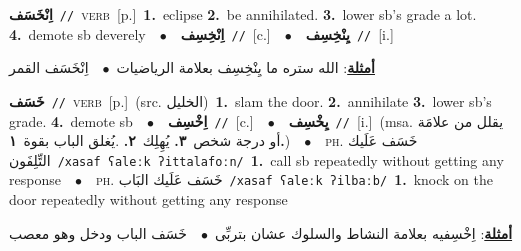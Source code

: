 \documentclass[10pt,a4paper,twoside]{article} %
\begin{document}
\begin{multicols}{2}
{\setlength\topsep{0pt}\textbf{\foreignlanguage{arabic}{اِنْخَسَف}}\ {\color{gray}\texttt{//}\color{black}}\ \textsc{verb}\ [p.]\ \textbf{1.}~eclipse  \textbf{2.}~be annihilated.  \textbf{3.}~lower sb's grade a lot.  \textbf{4.}~demote sb deverely\ \ $\bullet$\ \ \setlength\topsep{0pt}\textbf{\foreignlanguage{arabic}{اِنْخِسِف}}\ {\color{gray}\texttt{//}\color{black}}\ [c.]\ \ $\bullet$\ \ \setlength\topsep{0pt}\textbf{\foreignlanguage{arabic}{يِنْخِسِف}}\ {\color{gray}\texttt{//}\color{black}}\ [i.]\  \begin{flushright}\color{gray}\foreignlanguage{arabic}{\textbf{\underline{\foreignlanguage{arabic}{أمثلة}}}: الله ستره ما يِنْخِسِف بعلامة الرياضيات\ $\bullet$\ \  اِنْخَسَف القمر}\end{flushright}\color{black}} \vspace{2mm}

{\setlength\topsep{0pt}\textbf{\foreignlanguage{arabic}{خَسَف}}\ {\color{gray}\texttt{//}\color{black}}\ \textsc{verb}\ [p.]\ (src. \color{gray}\foreignlanguage{arabic}{الخليل}\color{black})\ \textbf{1.}~slam the door.  \textbf{2.}~annihilate  \textbf{3.}~lower sb's grade.  \textbf{4.}~demote sb\ \ $\bullet$\ \ \setlength\topsep{0pt}\textbf{\foreignlanguage{arabic}{اِخْسِف}}\ {\color{gray}\texttt{//}\color{black}}\ [c.]\ \ $\bullet$\ \ \setlength\topsep{0pt}\textbf{\foreignlanguage{arabic}{يِخْسِف}}\ {\color{gray}\texttt{//}\color{black}}\ [i.]\ \color{gray}(msa. \foreignlanguage{arabic}{يقلل من علامَة أو درجة شخص}~\foreignlanguage{arabic}{\textbf{٣.}}  \foreignlanguage{arabic}{يُهِلِك}~\foreignlanguage{arabic}{\textbf{٢.}}  .\foreignlanguage{arabic}{يُغلق الباب بقوة}~\foreignlanguage{arabic}{\textbf{١.}})\color{black}\ \ $\bullet$\ \ \textsc{ph.} \color{gray} \foreignlanguage{arabic}{خَسَف عَلَيك التِّلِفَون}\color{black}\ {\color{gray}\texttt{/{\sffamily xasaf ʕaleːk ʔittalafoːn}/}\color{black}}\ \textbf{1.}~call sb repeatedly without getting any response\ \ $\bullet$\ \ \textsc{ph.} \color{gray} \foreignlanguage{arabic}{خَسَف عَلَيك البَاب}\color{black}\ {\color{gray}\texttt{/{\sffamily xasaf ʕaleːk ʔilbaːb}/}\color{black}}\ \textbf{1.}~knock on the door repeatedly without getting any response\  \begin{flushright}\color{gray}\foreignlanguage{arabic}{\textbf{\underline{\foreignlanguage{arabic}{أمثلة}}}: اِخْسِفيه بعلامة النشاط والسلوك عشان بتربِّى\ $\bullet$\ \  خَسَف الباب ودخل وهو معصب}\end{flushright}\color{black}} \vspace{2mm}


\end{multicols}
\end{document}
